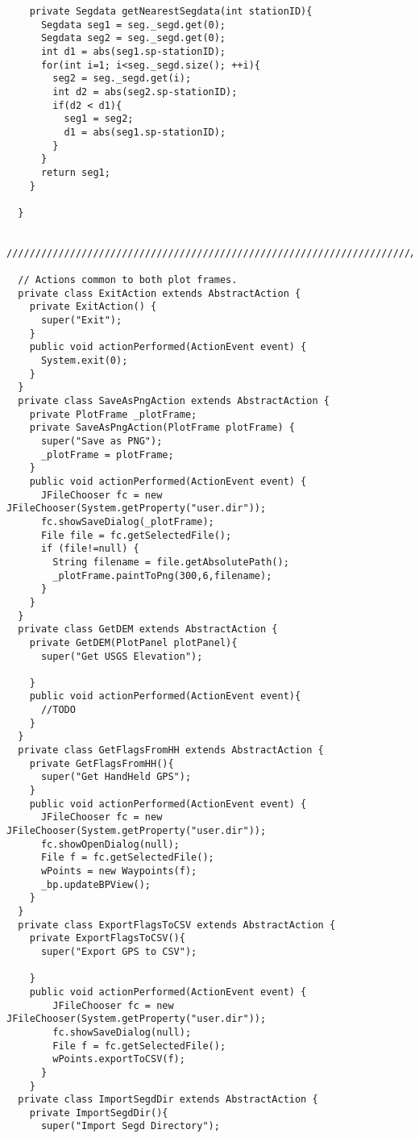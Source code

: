 \documentclass[11pt]{article}
\begin{document}
\begin{enumerate}
\begin{lstlisting}
    private Segdata getNearestSegdata(int stationID){
      Segdata seg1 = seg._segd.get(0);
      Segdata seg2 = seg._segd.get(0);
      int d1 = abs(seg1.sp-stationID);
      for(int i=1; i<seg._segd.size(); ++i){
        seg2 = seg._segd.get(i);
        int d2 = abs(seg2.sp-stationID);
        if(d2 < d1){
          seg1 = seg2;
          d1 = abs(seg1.sp-stationID);
        }
      }
      return seg1;
    }

  }

  ///////////////////////////////////////////////////////////////////////////
  
  // Actions common to both plot frames.
  private class ExitAction extends AbstractAction {
    private ExitAction() {
      super("Exit");
    }
    public void actionPerformed(ActionEvent event) {
      System.exit(0);
    }
  }
  private class SaveAsPngAction extends AbstractAction {
    private PlotFrame _plotFrame;
    private SaveAsPngAction(PlotFrame plotFrame) {
      super("Save as PNG");
      _plotFrame = plotFrame;
    }
    public void actionPerformed(ActionEvent event) {
      JFileChooser fc = new JFileChooser(System.getProperty("user.dir"));
      fc.showSaveDialog(_plotFrame);
      File file = fc.getSelectedFile();
      if (file!=null) {
        String filename = file.getAbsolutePath();
        _plotFrame.paintToPng(300,6,filename);
      }
    }
  }
  private class GetDEM extends AbstractAction {
    private GetDEM(PlotPanel plotPanel){
      super("Get USGS Elevation");
     
    }
    public void actionPerformed(ActionEvent event){
      //TODO
    }
  }
  private class GetFlagsFromHH extends AbstractAction {
    private GetFlagsFromHH(){
      super("Get HandHeld GPS");
    }
    public void actionPerformed(ActionEvent event) {
      JFileChooser fc = new JFileChooser(System.getProperty("user.dir"));
      fc.showOpenDialog(null);
      File f = fc.getSelectedFile();
      wPoints = new Waypoints(f);
      _bp.updateBPView(); 
    }
  }
  private class ExportFlagsToCSV extends AbstractAction {
    private ExportFlagsToCSV(){
      super("Export GPS to CSV");
        
    }
    public void actionPerformed(ActionEvent event) {
        JFileChooser fc = new JFileChooser(System.getProperty("user.dir"));
        fc.showSaveDialog(null);
        File f = fc.getSelectedFile();
        wPoints.exportToCSV(f);
      } 
    }
  private class ImportSegdDir extends AbstractAction {
    private ImportSegdDir(){
      super("Import Segd Directory");
        

\end{lstlisting}
\end{enumerate}
\end{document}
